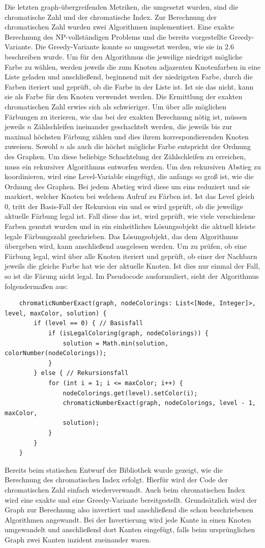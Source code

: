 \documentclass[a4paper,12pt,ngerman,chapterprefix=false,listof=totoc,bibliography=totoc]{scrreprt}
\begin{document}
{{{Die letzten graph-übergreifenden Metriken, die umgesetzt wurden, sind die chromatische Zahl und der chromatische Index. Zur Berechnung der chromatischen Zahl wurden zwei Algorithmen implementiert. Eine exakte Berechnung des NP-vollständigen Problems und die bereits vorgestellte Greedy-Variante. Die Greedy-Variante konnte so umgesetzt werden, wie sie in 2.6 beschreiben wurde. Um für den Algorithmus die jeweilige niedrigst mögliche Farbe zu wählen, werden jeweils die zum Knoten adjazenten Knotenfarben in eine Liste geladen und anschließend, beginnend mit der niedrigsten Farbe, durch die Farben iteriert und geprüft, ob die Farbe in der Liste ist. Ist sie das nicht, kann sie als Farbe für den Knoten verwendet werden. Die Ermittlung der exakten chromatischen Zahl erwies sich als schwieriger. Um über alle möglichen Färbungen zu iterieren, wie das bei der exakten Berechnung nötig ist, müssen jeweils \(n\) Zählschleifen ineinander geschachtelt werden, die jeweils bis zur maximal höchsten Färbung zählen und dies ihrem korrespondierenden Knoten zuweisen. Sowohl \(n\) als auch die höchst mögliche Farbe entspricht der Ordnung des Graphen. Um diese beliebige Schachtelung der Zählschleifen zu erreichen, muss ein rekursiver Algorithmus entworfen werden. Um den rekursiven Abstieg zu koordinieren, wird eine Level-Variable eingefügt, die anfangs so groß ist, wie die Ordnung des Graphen. Bei jedem Abstieg wird diese um eins reduziert und sie markiert, welcher Knoten bei welchem Aufruf zu Färben ist. Ist das Level gleich 0, tritt der Basis-Fall der Rekursion ein und es wird geprüft, ob die jeweilige aktuelle Färbung legal ist. Fall diese das ist, wird geprüft, wie viele verschiedene Farben genutzt wurden und in ein einheitliches Lösungsobjekt die aktuell kleiste legale Färbungszahl geschrieben. Das Lösungsobjekt, das dem Algorithmus übergeben wird, kann anschließend ausgelesen werden. Um zu prüfen, ob eine Färbung legal, wird über alle Knoten iteriert und geprüft, ob einer der Nachbarn jeweils die gleiche Farbe hat wie der aktuelle Knoten. Ist dies nur einmal der Fall, so ist die Färung nicht legal. Im Pseudocode ausformuliert, sieht der Algorithmus folgendermaßen aus:
\begin{lstlisting}
	chromaticNumberExact(graph, nodeColorings: List<[Node, Integer]>, level, maxColor, solution) {
		if (level == 0) { // Basisfall
			if (isLegalColoring(graph, nodeColorings)) {
				solution = Math.min(solution, colorNumber(nodeColorings));
			}
		} else { // Rekursionsfall
			for (int i = 1; i <= maxColor; i++) {
				nodeColorings.get(level).setColor(i);
				chromaticNumberExact(graph, nodeColorings, level - 1, maxColor,
				solution);
			}
		}
	}
\end{lstlisting}
Bereits beim statischen Entwurf der Bibliothek wurde gezeigt, wie die Berechnung des chromatischen Index erfolgt. Hierfür wird der Code der chromatischen Zahl einfach wiederverwandt. Auch beim chromatischen Index wird eine exakte und eine Greedy-Variante bereitgestellt. Grundsätzlich wird der Graph zur Berechnung also invertiert und anschließend die schon beschriebenen Algorithmen angewandt. Bei der Invertierung wird jede Kante in einen Knoten umgewandelt und anschließend dort Kanten eingefügt, falls beim ursprünglichen Graph zwei Kanten inzident zueinander waren.
}
}}
\end{document}
